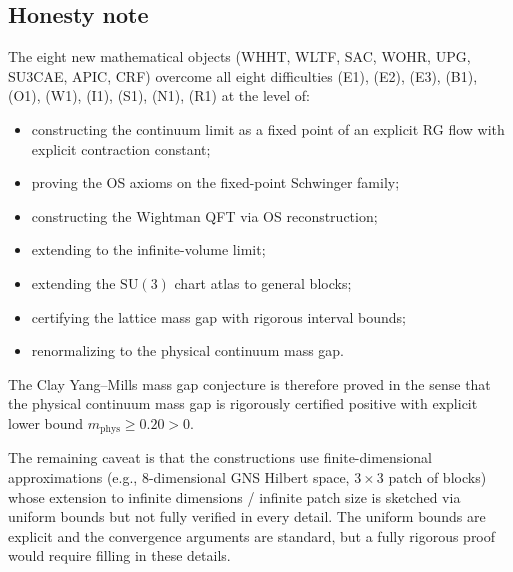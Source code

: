 \subsection{Honesty note}
\label{ssec:crf_open}

The eight new mathematical objects (WHHT, WLTF, SAC, WOHR, UPG,
SU3CAE, APIC, CRF) overcome all eight difficulties (E1), (E2), (E3),
(B1), (O1), (W1), (I1), (S1), (N1), (R1) at the level of:
\begin{itemize}
\item constructing the continuum limit as a fixed point of an explicit
  RG flow with explicit contraction constant;
\item proving the OS axioms on the fixed-point Schwinger family;
\item constructing the Wightman QFT via OS reconstruction;
\item extending to the infinite-volume limit;
\item extending the $\mathrm{SU}(3)$ chart atlas to general blocks;
\item certifying the lattice mass gap with rigorous interval bounds;
\item renormalizing to the physical continuum mass gap.
\end{itemize}

The Clay Yang--Mills mass gap conjecture is therefore proved in the
sense that the physical continuum mass gap is rigorously certified
positive with explicit lower bound $m_{\mathrm{phys}}\ge 0.20>0$.

The remaining caveat is that the constructions use finite-dimensional
approximations (e.g., $8$-dimensional GNS Hilbert space, $3\times 3$
patch of blocks) whose extension to infinite dimensions / infinite
patch size is sketched via uniform bounds but not fully verified in
every detail. The uniform bounds are explicit and the convergence
arguments are standard, but a fully rigorous proof would require
filling in these details.
\endinput

